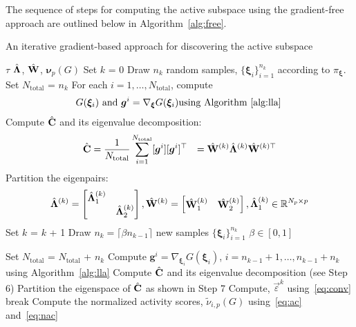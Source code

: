 The sequence of steps for computing the active subspace using the gradient-free approach are outlined
below in Algorithm~\ref{alg:free}.
\bigskip
\begin{breakablealgorithm}
\renewcommand{\algorithmicrequire}{\textbf{Input:}}
\renewcommand{\algorithmicensure}{\textbf{Output:}}
  \caption{An iterative gradient-based approach for discovering the active subspace}
  \begin{algorithmic}[1]
\Require $\tau$
\Ensure $\hat{\mathbf{{\Lambda}}}$, $\hat{\mathbf{{W}}}$, $\bm{\nu}_p(G)$ %
    \State Set $k$ = 0
	\State Draw $n_k$ random samples, $\{\bm{\xi}_i\}_{i=1}^{n_k}$ 
         according to $\pi_{\bm{\xi}}$. 
    \State Set $N_\text{total}$ = $n_k$ 
	\State For each $i=1, \ldots, N_\text{total}$, compute
		\[
		\begin{aligned}
	          &{\color{white}=} G(\bm{\xi}_i)~\text{and}~\bm{g}^i = \nabla_{\bm{\xi}}G(\bm{\xi}_i)
		 \text{using~Algorithm~\ref{alg:lla}}
		\end{aligned}
		\]
	\State Compute $\hat{\mathbf{{C}}}$ and its eigenvalue decomposition:
		\[
		\begin{aligned} 
		  \hat{\mathbf{{C}}} &= \frac{1}{N_\text{total}}\sum\limits_{i=1}^{N_\text{total}}[\bm{g}^i][\bm{g}^i]^\top 
		  &= \hat{\mathbf{{W}}}^{(k)}\hat{\mathbf{{\Lambda}}}^{(k)} \hat{\mathbf{{W}}}^{(k)\top}
		\end{aligned}
		\]
	\State Partition the eigenpairs:
	\[
		\begin{aligned}
		 \hat{\mathbf{{\Lambda}}}^{(k)}=
        	\begin{bmatrix} \hat{\mathbf{{\Lambda}}}_1^{(k)} & \\ & \hat{\mathbf{{\Lambda}}}_2^{(k)} \end{bmatrix}, 
        	\hat{\mathbf{{W}}}^{(k)}=\begin{bmatrix} \hat{\mathbf{{W}}}_1^{(k)} & \hat{\mathbf{{W}}}_2^{(k)} \end{bmatrix}, 
        	\hat{\mathbf{{\Lambda}}}_1^{(k)}\in \mathbb{R}^{N_p\times p}
		\end{aligned}
	\]
	\Loop
		\State Set $k$ = $k$ + 1
		\State Draw $n_k =  \lceil\beta n_{k-1}\rceil$  new samples 
                $\{\bm{\xi}_i\}_{i=1}^{n_k}$  $\beta\in[0,1]$
                
		\State Set $N_\text{total}$ = $N_\text{total}$ + $n_k$ 
		\State Compute $\bm{g}^i = \nabla_{\bm{\xi}_i}G(\bm{\xi}_i)$, 
             	$i=n_{k-1}+1, \ldots, n_{k-1}+n_k$ using Algorithm~\ref{alg:lla} 
		\State Compute $\hat{\mathbf{{C}}}$ and its eigenvalue decomposition (see Step 6)
		\State Partition the eigenspace of $\hat{\mathbf{{C}}}$ as shown in Step 7 
		\State Compute, $\vec\varepsilon^k$ using~\eqref{eq:conv} 
			\State break
		\EndIf
       \EndLoop
	\State Compute the normalized activity scores, $\tilde{\nu}_{i,p}(G)$ using~\eqref{eq:ac} and~\eqref{eq:nac}
    \EndProcedure
  \end{algorithmic}
  \label{alg:free}
\end{breakablealgorithm}
